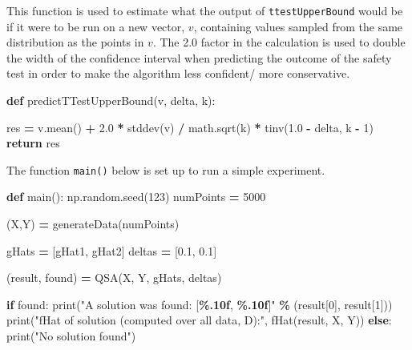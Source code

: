 \documentclass[12pt, twoside]{amherstthesis}
\newenvironment{Shaded}{\begin{snugshade}}{\end{snugshade}}
\newcommand{\BuiltInTok}[1]{#1}
\newcommand{\ControlFlowTok}[1]{\textcolor[rgb]{0.13,0.29,0.53}{\textbf{#1}}}
\newcommand{\DecValTok}[1]{\textcolor[rgb]{0.00,0.00,0.81}{#1}}
\newcommand{\FloatTok}[1]{\textcolor[rgb]{0.00,0.00,0.81}{#1}}
\newcommand{\KeywordTok}[1]{\textcolor[rgb]{0.13,0.29,0.53}{\textbf{#1}}}
\newcommand{\NormalTok}[1]{#1}
\newcommand{\OperatorTok}[1]{\textcolor[rgb]{0.81,0.36,0.00}{\textbf{#1}}}
\newcommand{\SpecialCharTok}[1]{\textcolor[rgb]{0.81,0.36,0.00}{\textbf{#1}}}
\newcommand{\StringTok}[1]{\textcolor[rgb]{0.31,0.60,0.02}{#1}}
\begin{document}
This function is used to estimate what the output of \texttt{ttestUpperBound} would be if it were to be run on a new vector, \(v\), containing values sampled from the same distribution as the points in \(v\). The 2.0 factor in the calculation is used to double the width of the confidence interval when predicting the outcome of the safety test in order to make the algorithm less confident/ more conservative.
\begin{Shaded}
\begin{Highlighting}[]
\KeywordTok{def}\NormalTok{ predictTTestUpperBound(v, delta, k):}
    
\NormalTok{    res }\OperatorTok{=}\NormalTok{ v.mean() }\OperatorTok{+} \FloatTok{2.0} \OperatorTok{*}\NormalTok{ stddev(v) }\OperatorTok{/}\NormalTok{ math.sqrt(k) }\OperatorTok{*}\NormalTok{ tinv(}\FloatTok{1.0} \OperatorTok{{-}}\NormalTok{ delta, k }\OperatorTok{{-}} \DecValTok{1}\NormalTok{)}
    \ControlFlowTok{return}\NormalTok{ res}
\end{Highlighting}
\end{Shaded}
\noindent The function \texttt{main()} below is set up to run a simple experiment.
\begin{Shaded}
\begin{Highlighting}[]
\KeywordTok{def}\NormalTok{ main():}
\NormalTok{    np.random.seed(}\DecValTok{123}\NormalTok{)  }
\NormalTok{    numPoints }\OperatorTok{=} \DecValTok{5000}   

\NormalTok{    (X,Y)  }\OperatorTok{=}\NormalTok{ generateData(numPoints)  }

\NormalTok{    gHats  }\OperatorTok{=}\NormalTok{ [gHat1, gHat2] }
\NormalTok{    deltas }\OperatorTok{=}\NormalTok{ [}\FloatTok{0.1}\NormalTok{, }\FloatTok{0.1}\NormalTok{]}

\NormalTok{    (result, found) }\OperatorTok{=}\NormalTok{ QSA(X, Y, gHats, deltas) }
    
    \ControlFlowTok{if}\NormalTok{ found:}
        \BuiltInTok{print}\NormalTok{(}\StringTok{"A solution was found: [}\SpecialCharTok{\%.10f}\StringTok{, }\SpecialCharTok{\%.10f}\StringTok{]"} \OperatorTok{\%}\NormalTok{ (result[}\DecValTok{0}\NormalTok{], result[}\DecValTok{1}\NormalTok{]))}
        \BuiltInTok{print}\NormalTok{(}\StringTok{"fHat of solution (computed over all data, D):"}\NormalTok{, }
\NormalTok{        fHat(result, X, Y))}
    \ControlFlowTok{else}\NormalTok{:}
        \BuiltInTok{print}\NormalTok{(}\StringTok{"No solution found"}\NormalTok{)}
\end{Highlighting}
\end{Shaded}
\end{document}
